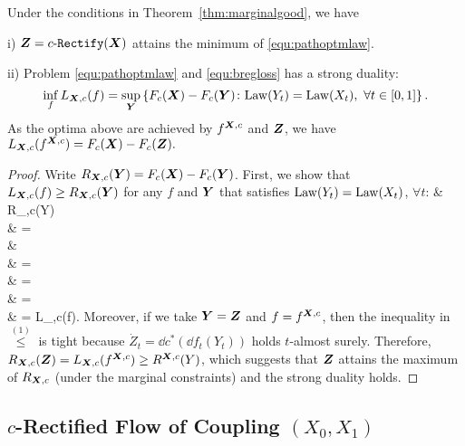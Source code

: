  \begin{thm}\label{thm:optmultimarg}
 Under the  conditions in Theorem~\ref{thm:marginalgood}, we have 
 
 i) ${\boldsymbol{Z}} = c\text{-}\mathtt{Rectify}({\boldsymbol{X}})$ attains the minimum of \eqref{equ:pathoptmlaw}. 
 
 ii) Problem 
 \eqref{equ:pathoptmlaw} and \eqref{equ:bregloss} has a strong duality: 
 $$ 
 \inf_f L_{{{\boldsymbol{X}}},c}(f) = 
 \sup_{{\boldsymbol{Y}}}
 \left \{F_c({\boldsymbol{X}}) -  F_c({\boldsymbol{Y}})  
 \colon  \mathrm{Law}(Y_t) =\mathrm{Law}(X_t), ~\forall t\in[0,1]
 \right \}. 
$$
As the optima above are achieved by $f^{{{\boldsymbol{X}}},c}$ and ${\boldsymbol{Z}}$, we have 
$L_{{{\boldsymbol{X}}},c}(f^{{{\boldsymbol{X}}},c}) = F_c({\boldsymbol{X}}) - F_c({\boldsymbol{Z}}).$
 \end{thm}
 \begin{proof}
 Write   $R_{{{\boldsymbol{X}}},c}( {\boldsymbol{Y}}) = F_c({\boldsymbol{X}}) - F_c({\boldsymbol{Y}})$. 
First, we show that $ L_{{{\boldsymbol{X}}},c}(f) \geq  R_{{{\boldsymbol{X}}},c}({{\boldsymbol{Y}}})$  %
for 
any  $f$ and ${\boldsymbol{Y}}$ that satisfies $\mathrm{Law}(Y_t) = \mathrm{Law}(X_t)$, $\forall t$: 
\bb
  & R_{\X,c}(\vv Y) \\ 
 & = \E{}  \\
 &  \E{}  \\
 & = \E{} \!\!\!\!\!\!\! \\ 
  & = \E{} \!\!\!\!\!\!\!   \\
 & = \E{}  \!\!\!\!\!\!\!\\  %
 & =  L_{\X,c}(f).
\ee 
Moreover, if we take 
${\boldsymbol{Y}} = {\boldsymbol{Z}}$ and $f = f^{{{\boldsymbol{X}}},c}$, 
then the inequality in $\overset{(1)}{\leq}$ is tight because $\dot Z_t = \dd c^*(\dd f_t(Y_t))$ holds $t$-almost surely. 
Therefore, $R_{{{\boldsymbol{X}}},c}({\boldsymbol{Z}}) =  L_{{{\boldsymbol{X}}},c}(f^{{{\boldsymbol{X}}},c})
\geq R^{{{\boldsymbol{X}}}, c} (Y) $, which suggests that ${\boldsymbol{Z}}$ attains the maximum of $R_{{{\boldsymbol{X}}},c}$ (under the marginal constraints) and the strong duality holds. 
 \end{proof}



\subsection{$c$-Rectified Flow of Coupling $(X_0,X_1)$} 
\label{sec:crectifyCoupling}

